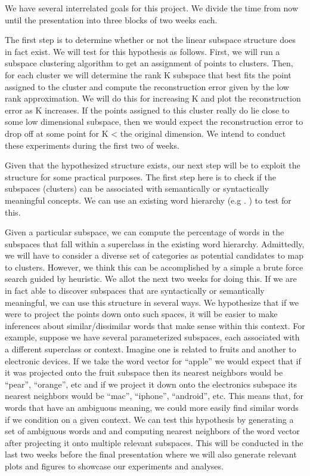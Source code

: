 We have several interrelated goals for this project. 
We divide the time from now until the presentation into three blocks of two weeks each.
 
The first step is to determine whether or not the linear subspace structure does in fact exist. 
We will test for this hypothesis as follows. 
 First, we will run a subspace clustering algorithm to get an assignment of points to clusters. 
Then, for each cluster we will determine the rank K subspace that best fits the point assigned to the cluster and compute the reconstruction error given by the low rank approximation. 
We will do this for increasing K and plot the reconstruction error as K increases. 
If the points assigned to this cluster really do lie close to some low dimensional subspace, then we would expect the reconstruction error to drop off at some point for K < the original dimension. 
We intend to conduct these experiments during the first two of weeks.
 
	Given that the hypothesized structure exists, our next step will be to exploit the structure for some practical purposes. 
The first step here is to check if the subspaces (clusters) can be associated with semantically or syntactically meaningful concepts. 
We can use an existing word hierarchy (e.g
. ) to test for this. 
 
Given a particular subspace, we can compute the percentage of words in the subspaces that fall within a superclass in the existing word hierarchy. 
Admittedly, we will have to consider a diverse set of categories as potential candidates to map to clusters. 
However, we think this can be accomplished by a simple a brute force search guided by heuristic. 
We allot the next two weeks for doing this. 
If we are in fact able to discover subspaces that are syntactically or semantically meaningful, we can use this structure in several ways. 
We hypothesize that if we were to project the points down onto such spaces, it will be easier to make inferences about similar/dissimilar words that make sense within this context. 
For example, suppose we have several parameterized subspaces, each associated with a different superclass or context. 
Imagine one is related to fruits and another to electronic devices. 
If we take the word vector for “apple” we would expect that if it was projected onto the fruit subspace then its nearest neighbors would be “pear”, “orange”, etc and if we project it down onto the electronics subspace its nearest neighbors would be “mac”, “iphone”, “android”, etc. 
This means that, for words that have an ambiguous meaning,  we could more easily find similar words if we condition on a given context. 
We can test this hypothesis by generating a set of ambiguous words and and computing nearest neighbors of the word vector after projecting it onto multiple relevant subspaces. 
This will be conducted in the last two weeks before the final presentation where we will also generate relevant plots and figures to showcase our experiments and analyses. 
 
